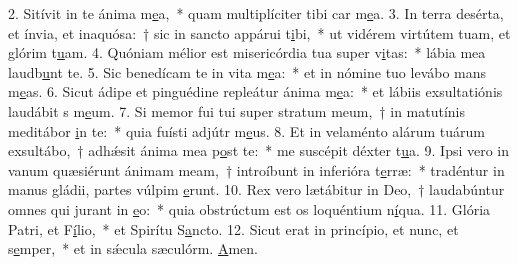 2. Sitívit in te ánima m\uline{e}a,~* quam multiplíciter tibi car m\uline{e}a.
3. In terra desérta, et ínvia, et inaquósa:~† sic in sancto appárui t\uline{i}bi,~* ut vidérem virtútem tuam, et glórim t\uline{u}am.
4. Quóniam mélior est misericórdia tua super v\uline{i}tas:~* lábia mea laudb\uline{u}nt te.
5. Sic benedícam te in vita m\uline{e}a:~* et in nómine tuo levábo mans m\uline{e}as.
6. Sicut ádipe et pinguédine repleátur ánima m\uline{e}a:~* et lábiis exsultatiónis laudábit s m\uline{e}um.
7. Si memor fui tui super stratum meum,~† in matutínis meditábor \uline{i}n te:~* quia fuísti adjútr m\uline{e}us.
8. Et in velaménto alárum tuárum exsultábo,~† adhǽsit ánima mea p\uline{o}st te:~* me suscépit déxter t\uline{u}a.
9. Ipsi vero in vanum quæsiérunt ánimam meam,~† introíbunt in inferióra t\uline{e}rræ:~* tradéntur in manus gládii, partes vúlpim \uline{e}runt.
10. Rex vero lætábitur in Deo,~† laudabúntur omnes qui jurant in \uline{e}o:~* quia obstrúctum est os loquéntium n\uline{í}qua.
11. Glória Patri, et F\uline{í}lio,~* et Spirítu S\uline{a}ncto.
12. Sicut erat in princípio, et nunc, et s\uline{e}mper,~* et in sǽcula sæculórm. \uline{A}men.
